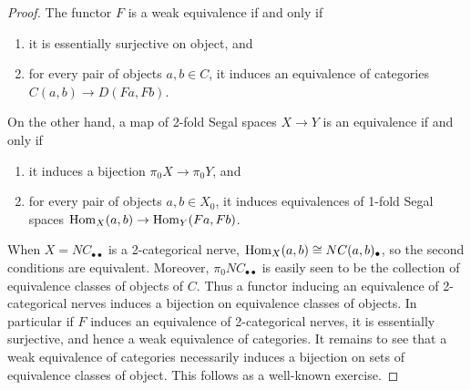 \documentclass{amsart}
\begin{document}
\begin{proof}
	The functor $F$ is a weak equivalence if and only if 
	\begin{enumerate}
		\item it is essentially surjective on object, and
		\item for every pair of objects $a,b \in C$,  it induces an equivalence of categories $C(a,b) \to D(Fa, Fb)$.
	\end{enumerate}
On the other hand, a map of 2-fold Segal spaces $X \to Y$ is an equivalence if and only if
\begin{enumerate}
	\item it induces a bijection $\pi_0X \to \pi_0Y$, and
	\item for every pair of objects $a,b \in X_0$, it induces equivalences of 1-fold Segal spaces $\operatorname{Hom}_X(a,b) \to \operatorname{Hom}_Y(Fa, Fb)$.
\end{enumerate}
When $X = NC_{\bullet \bullet}$  is a 2-categorical nerve, $\operatorname{Hom}_X(a,b) \cong NC(a,b)_{\bullet}$, so the second conditions are equivalent. Moreover, $\pi_0 NC_{\bullet \bullet}$ is easily seen to be the collection of equivalence classes of objects of $C$. Thus a functor inducing an equivalence of 2-categorical nerves induces a bijection on equivalence classes of objects. In particular if $F$ induces an equivalence of 2-categorical nerves, it is essentially surjective, and hence a weak equivalence of categories. It remains to see that a weak equivalence of categories necessarily induces a bijection on sets of equivalence classes of object. This follows as a well-known exercise.
\end{proof}


\end{document}
